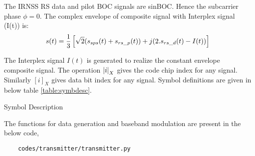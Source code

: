 The IRNSS RS data and pilot BOC signals are sinBOC. Hence the subcarrier phase $\phi=0$.
The complex envelope of composite signal with Interplex signal (I(t)) is:
\begin{equation}
s(t) = \dfrac{1}{3} {}\left[\sqrt{2} (s_{sps}(t) + s_{rs\_p}(t)) + j(2. s_{rs\_d}(t) - I(t))\right] 
\end{equation}

The Interplex signal $I(t)$ is generated to realize the constant envelope composite signal. The operation $\left\vert i\right\vert_X$ gives the code chip index for any signal. Similarly $[i]_X$ gives data bit index for any signal.
Symbol definitions are given in below table \ref{table:symbdesc}.

\begin{table}[h]

\caption{Symbol Description}
\label{table:symbdesc}
\end{table}

The functions for data generation and baseband modulation are present in the below code,
\begin{lstlisting}
    codes/transmitter/transmitter.py
\end{lstlisting}
